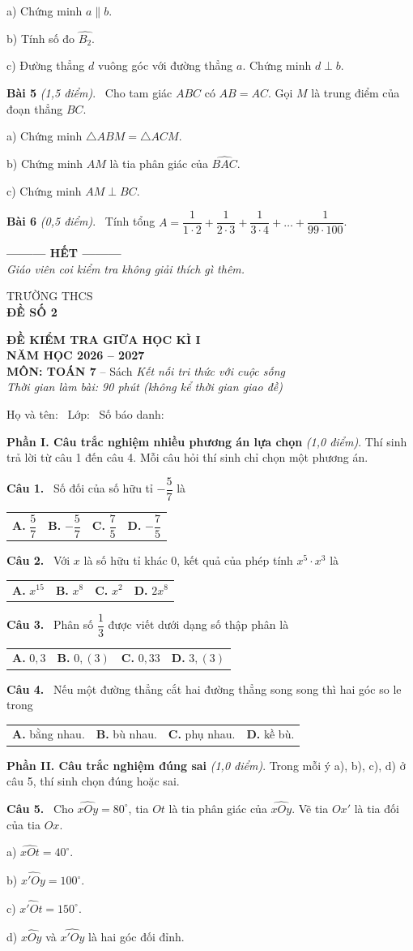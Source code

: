 \documentclass[12pt,a4paper]{article}
\makeatletter
\newcommand{\bonpa}[4]{\par\noindent\begin{tabularx}{\linewidth}{@{\hspace{0.6cm}}XXXX@{}}
\textbf{A.} #1 & \textbf{B.} #2 & \textbf{C.} #3 & \textbf{D.} #4\end{tabularx}\par}
\newcommand{\cau}[1]{\par\medskip\textbf{Câu #1.}~}
\newcommand{\bai}[2]{\par\medskip\textbf{Bài #1} \textit{(#2)}.~}
\newcommand{\y}[1]{\par\hspace*{0.6cm}#1}
\newcommand{\phan}[1]{\par\bigskip{\large\textbf{#1}}\par\smallskip}
\makeatother
\begin{document}
\y{a) Chứng minh $a\parallel b$.}
\y{b) Tính số đo $\widehat{B_2}$.}
\y{c) Đường thẳng $d$ vuông góc với đường thẳng $a$. Chứng minh $d\perp b$.}
\bai{5}{1,5 điểm} Cho tam giác $ABC$ có $AB=AC$. Gọi $M$ là trung điểm của đoạn thẳng $BC$.
\y{a) Chứng minh $\triangle ABM=\triangle ACM$.}
\y{b) Chứng minh $AM$ là tia phân giác của $\widehat{BAC}$.}
\y{c) Chứng minh $AM\perp BC$.}
\bai{6}{0,5 điểm} Tính tổng $A=\dfrac{1}{1\cdot 2}+\dfrac{1}{2\cdot 3}+\dfrac{1}{3\cdot 4}+\ldots+\dfrac{1}{99\cdot 100}$.

\bigskip\begin{center}\textbf{--------- HẾT ---------}\\
\textit{Giáo viên coi kiểm tra không giải thích gì thêm.}\end{center}

\newpage
\noindent
\begin{minipage}[t]{0.38\linewidth}\centering
TRƯỜNG THCS \dotfill\\[2pt]
\textbf{ĐỀ SỐ 2}
\end{minipage}\hfill
\begin{minipage}[t]{0.6\linewidth}\centering
\textbf{ĐỀ KIỂM TRA GIỮA HỌC KÌ I}\\
\textbf{NĂM HỌC 2026 -- 2027}\\
\textbf{MÔN: TOÁN 7} -- Sách \textit{Kết nối tri thức với cuộc sống}\\
\textit{Thời gian làm bài: 90 phút (không kể thời gian giao đề)}
\end{minipage}

\medskip
Họ và tên: \dotfill\ Lớp: \makebox[2cm]{\dotfill}\ Số báo danh: \makebox[2.5cm]{\dotfill}
\phan{A. TRẮC NGHIỆM (3,0 điểm)}
\textbf{Phần I. Câu trắc nghiệm nhiều phương án lựa chọn} \textit{(1,0 điểm)}. Thí sinh trả lời từ câu 1 đến câu 4. Mỗi câu hỏi thí sinh chỉ chọn một phương án.
\cau{1} Số đối của số hữu tỉ $-\dfrac{5}{7}$ là
\bonpa{$\dfrac{5}{7}$}{$-\dfrac{5}{7}$}{$\dfrac{7}{5}$}{$-\dfrac{7}{5}$}
\cau{2} Với $x$ là số hữu tỉ khác $0$, kết quả của phép tính $x^{5}\cdot x^{3}$ là
\bonpa{$x^{15}$}{$x^{8}$}{$x^{2}$}{$2x^{8}$}
\cau{3} Phân số $\dfrac{1}{3}$ được viết dưới dạng số thập phân là
\bonpa{$0{,}3$}{$0{,}(3)$}{$0{,}33$}{$3{,}(3)$}
\cau{4} Nếu một đường thẳng cắt hai đường thẳng song song thì hai góc so le trong
\bonpa{bằng nhau.}{bù nhau.}{phụ nhau.}{kề bù.}

\medskip\textbf{Phần II. Câu trắc nghiệm đúng sai} \textit{(1,0 điểm)}. Trong mỗi ý a), b), c), d) ở câu 5, thí sinh chọn đúng hoặc sai.
\cau{5} Cho $\widehat{xOy}=80^\circ$, tia $Ot$ là tia phân giác của $\widehat{xOy}$. Vẽ tia $Ox'$ là tia đối của tia $Ox$.
\y{a) $\widehat{xOt}=40^\circ$.}
\y{b) $\widehat{x'Oy}=100^\circ$.}
\y{c) $\widehat{x'Ot}=150^\circ$.}
\y{d) $\widehat{xOy}$ và $\widehat{x'Oy}$ là hai góc đối đỉnh.}
\end{document}
